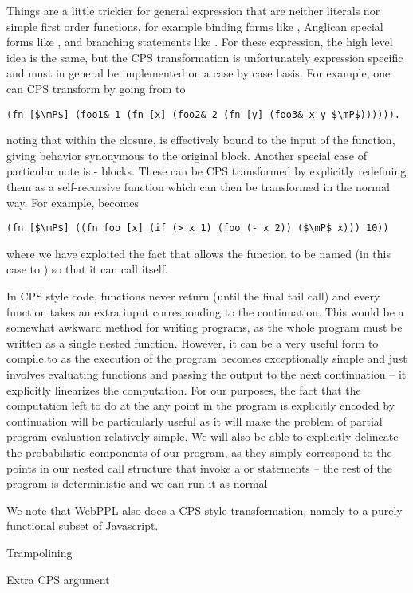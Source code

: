 Things are a little
trickier for general expression that are neither literals nor simple first order functions, for example
binding forms like , Anglican special forms like \sample, and branching statements like .
For these expression, the high level idea is the same, but the CPS transformation is unfortunately 
expression specific and must in general be implemented on a case by case basis.  
For example, one can CPS transform  by going from
 to
 \begin{lstlisting}[basicstyle=\ttfamily\small,frame=none]
 (fn [$\mP$] (foo1& 1 (fn [x] (foo2& 2 (fn [y] (foo3& x y $\mP$)))))).
 \end{lstlisting}\vspace{-8pt}
noting that within the  closure,  is
effectively bound to the input of the function, giving behavior synonymous to the original
 block.  
Another special case of particular note is - blocks.  These can be CPS
transformed by explicitly redefining them as a self-recursive function which can then
be transformed in the normal way.  For example,
becomes
\begin{lstlisting}[basicstyle=\ttfamily\small,frame=none]
 (fn [$\mP$] ((fn foo [x] (if (> x 1) (foo (- x 2)) ($\mP$ x))) 10))
 \end{lstlisting}\vspace{-8pt}
where we have exploited the fact that  allows the function to be named (in this case to
) so that it can call itself.
 
In CPS style code, functions never return (until the final tail call) and every function takes an
extra input corresponding to the continuation.  This would be a somewhat awkward method for
writing programs, as the whole program must be written as a single nested function.  However,
it can be a very useful form to compile to as the execution of the program becomes
exceptionally simple and just involves evaluating functions and passing the output to the
next continuation -- it explicitly linearizes the computation.  For our purposes, the fact
that the computation left to do at the any point in the program is explicitly encoded by
continuation will be particularly useful as it will make the problem of partial program
evaluation relatively simple.  We will also be able to explicitly delineate the probabilistic
components of our program, as they simply correspond to the points in our nested call
structure that invoke a \sample or \observe statements -- the rest of the program is
deterministic and we can run it as normal

We note that WebPPL also does a CPS style transformation, namely to a purely functional
subset of Javascript.

Trampolining

Extra CPS argument